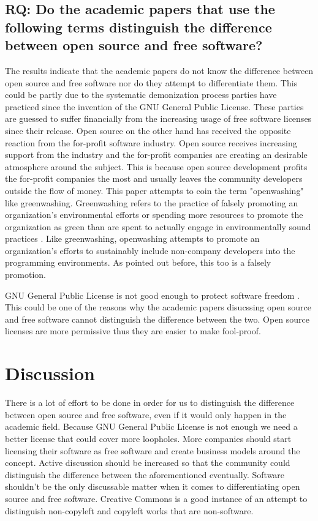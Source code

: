 \documentclass[conference]{IEEEtran}
\begin{document}
\subsection{RQ: Do the academic papers that use the following terms distinguish the difference between open source and free software?}
The results indicate that the academic papers do not know the difference between open source and free software nor do they attempt to differentiate them. This could be partly due to the systematic demonization process parties have practiced since the invention of the GNU General Public License. These parties are guessed to suffer financially from the increasing usage of free software licenses since their release. Open source on the other hand has received the opposite reaction from the for-profit software industry. Open source receives increasing support from the industry and the for-profit companies are creating an desirable atmosphere around the subject. This is because open source development profits the for-profit companies the most and usually leaves the community developers outside the flow of money. This paper attempts to coin the term "openwashing" like greenwashing. Greenwashing refers to the practice of falsely promoting an organization's environmental efforts or spending more resources to promote the organization as green than are spent to actually engage in environmentally sound practices \cite{greenwashing}. Like greenwashing, openwashing attempts to promote an organization's efforts to sustainably include non-company developers into the programming environments. As pointed out before, this too is a falsely promotion.

GNU General Public License is not good enough to protect software freedom \cite{rhelanalysis} \cite{gpldebug}. This could be one of the reasons why the academic papers disucssing open source and free software cannot distinguish the difference between the two. Open source licenses are more permissive thus they are easier to make fool-proof.

\section{Discussion}
There is a lot of effort to be done in order for us to distinguish the difference between open source and free software, even if it would only happen in the academic field. Because GNU General Public License is not enough we need a better license that could cover more loopholes. More companies should start licensing their software as free software and create business models around the concept. Active discussion should be increased so that the community could distinguish the difference between the aforementioned eventually. Software shouldn't be the only discussable matter when it comes to differentiating open source and free software. Creative Commons is a good instance of an attempt to distinguish non-copyleft and copyleft works that are non-software.
\end{document}
